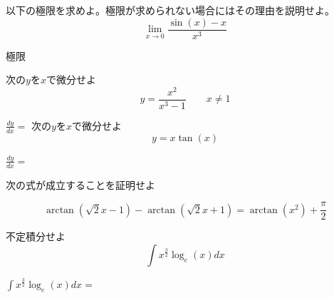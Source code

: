 \documentclass[times, 10pt,dvipdfmx]{jsarticle}
\newcommand{\ah}{\vspace{8cm}}
\newcommand{\anscol}{\underline{\hspace{6cm}}}
\begin{document}
\begin{qlist}
    \item 以下の極限を求めよ。極限が求められない場合にはその理由を説明せよ。
    \begin{equation}
        \lim_{x\to 0} \frac{\sin(x) - x}{x^3} \nonumber 
    \end{equation}
    
\vspace{5mm}
極限\anscol
\ah
\end{qlist}
\begin{qlist}
\qitem 次の$y$を$x$で微分せよ
\begin{equation}
y = \frac{x^2}{x^3-1} \qquad  x \neq 1\nonumber
\end{equation}

\vspace{5mm}
$\frac{dy}{dx}=$\anscol
\ah
\qitem 次の$y$を$x$で微分せよ
\begin{equation}
y = x{\tan{(x)}}\nonumber 
\end{equation}

\vspace{5mm}
$\frac{dy}{dx}=$\anscol
\ah
\end{qlist}
\begin{qlist}
\qitem 次の式が成立することを証明せよ

\begin{equation}
\arctan({\sqrt{2}x -1}) - \arctan({\sqrt{2}x + 1})  = \arctan({x^2}) + \frac{\pi}{2}  \nonumber
\end{equation}
\ah

\end{qlist}
%
\begin{qlist}
\qitem 不定積分せよ
\begin{equation}
\int x^{\frac{3}{2}} \log_e(x) dx \nonumber 
\end{equation}

\vspace{5mm}
$\int x^{\frac{3}{2}} \log_e(x) dx =$\anscol
\ah
\end{qlist}
\end{document}
